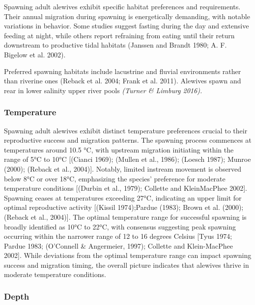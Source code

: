 \documentclass[
]{book}
\begin{document}
Spawning adult alewives exhibit specific habitat preferences and requirements. Their annual migration during spawning is energetically demanding, with notable variations in behavior. Some studies suggest fasting during the day and extensive feeding at night, while others report refraining from eating until their return downstream to productive tidal habitats (Janssen and Brandt 1980; A. F. Bigelow et al. 2002).

Preferred spawning habitats include lacustrine and fluvial environments rather than riverine ones (Reback et al. 2004; Frank et al. 2011). Alewives spawn and rear in lower salinity upper river pools \emph{(Turner \& Limburg 2016).}

\hypertarget{temperature}{%
\subsubsection{Temperature}\label{temperature}}

Spawning adult alewives exhibit distinct temperature preferences crucial to their reproductive success and migration patterns. The spawning process commences at temperatures around 10.5 °C, with upstream migration initiating within the range of 5°C to 10°C {[}(Cianci 1969); (Mullen et al., 1986); (Loesch 1987); Munroe (2000); (Reback et al., 2004){]}. Notably, limited instream movement is observed below 8°C or over 18°C, emphasizing the species' preference for moderate temperature conditions {[}(Durbin et al., 1979); Collette and KleinMacPhee 2002{]}. Spawning ceases at temperatures exceeding 27°C, indicating an upper limit for optimal reproductive activity {[}(Kissil 1974);Pardue (1983); Brown et al. (2000); (Reback et al., 2004){]}. The optimal temperature range for successful spawning is broadly identified as 10°C to 22°C, with consensus suggesting peak spawning occurring within the narrower range of 12 to 16 degrees Celsius {[}Tyus 1974; Pardue 1983; (O'Connell \& Angermeier, 1997); Collette and Klein-MacPhee 2002{]}. While deviations from the optimal temperature range can impact spawning success and migration timing, the overall picture indicates that alewives thrive in moderate temperature conditions.

\hypertarget{depth}{%
\subsubsection{Depth}\label{depth}}
\end{document}
